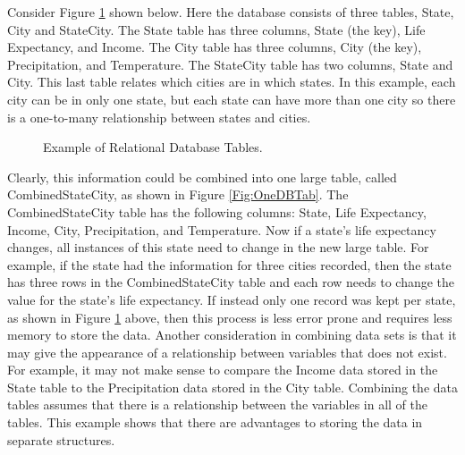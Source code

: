 \documentclass{article}[11pt]
\begin{document}
Consider Figure \ref{Fig:DBTab} shown below.  Here the database consists of
three tables, State, City and StateCity.  The State table has three columns,
State (the key), Life Expectancy, and Income.  The City table has three
columns, City (the key), Precipitation, and Temperature.  The StateCity table
has two columns, State and City.  This last table relates which cities are in
which states.  In this example, each city can be in only one state, but each
state can have more than one city so there is a one-to-many relationship
between states and cities.


\begin{figure}[ht]
  \begin{center}
    \caption{ Example of Relational Database Tables. }
    \label{Fig:DBTab}
  \end{center}
\end{figure}

Clearly, this information could be combined into one large table, called
CombinedStateCity, as shown in Figure \ref{Fig:OneDBTab}.  The
CombinedStateCity table has the following columns: State, Life
Expectancy, Income, City, Precipitation, and Temperature.  Now if a state's
life expectancy changes, all instances of this state need to change
in the new large table.  For example, if the state had the information for
three cities recorded, then the state has three rows in the
CombinedStateCity table and each row needs to change the value for the
state's life expectancy.  If instead only one record was kept per state, as
shown in Figure \ref{Fig:DBTab} above, then this process is less error
prone and requires less memory to store the data.  Another consideration in
combining data sets is that it may give the appearance of a relationship
between variables that does not exist.  For example, it may not make sense to
compare the Income data stored in the State table to the Precipitation data
stored in the City table.  Combining the data tables assumes that there is a
relationship between the variables in all of the tables.  This example shows
that there are advantages to storing the data in separate structures.
\end{document}
